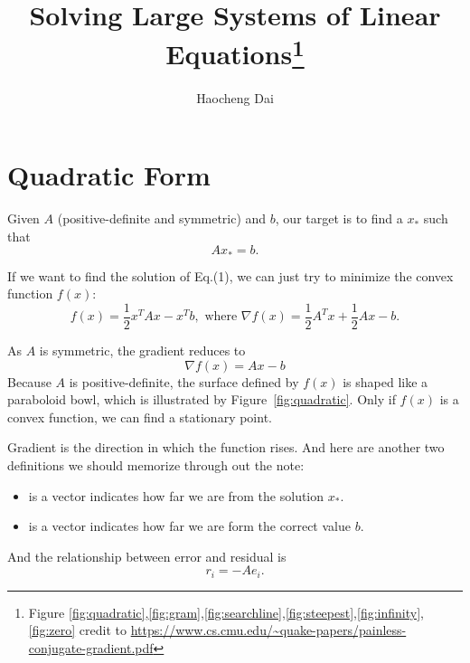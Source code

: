 \documentclass{article}
\title{Solving Large Systems of Linear Equations\thanks{Figure \ref{fig:quadratic},\ref{fig:gram},\ref{fig:searchline},\ref{fig:steepest},\ref{fig:infinity},\ref{fig:zero} credit to \url{https://www.cs.cmu.edu/~quake-papers/painless-conjugate-gradient.pdf}}}
\author{Haocheng Dai }
\date{}
\begin{document}
\maketitle
\section{Quadratic Form}
Given $A$ (positive-definite and symmetric) and $ b$, our target is to find a $x_*$ such that
\begin{equation}
    Ax_*= b.
\end{equation}

If we want to find the solution of Eq.(1), we can just try to minimize the convex function $f(x)$:
\begin{equation}
   f( x)=\frac{1}{2} x^TA x- x^T b,\text{   where } \nabla f( x)=\frac{1}{2}A^Tx+\frac{1}{2}Ax- b.
\end{equation}

As $A$ is symmetric, the gradient reduces to
\begin{equation*}
    \nabla f(x)=Ax-b
\end{equation*}
Because $A$ is positive-definite, the surface defined by $f(x)$ is shaped like a paraboloid bowl, which is illustrated by Figure~\ref{fig:quadratic}. Only if $f(x)$ is a convex function, we can find a stationary point.

Gradient is the direction in which the function rises. And here are another two definitions we should memorize through out the note:
\begin{itemize}
    \item {}   is a vector indicates how far we are from the solution $x_*$.
    \item {}  is a vector indicates how far we are form the correct value $b$.
\end{itemize}

And the relationship between error and residual is 
\begin{equation}
    r_i=-Ae_i.
\end{equation}
\end{document}
